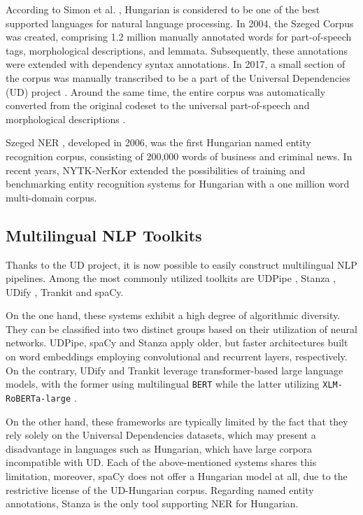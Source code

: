 \documentclass[runningheads,a4paper]{llncs}
\newcommand{\spacy}{spaCy}
\newcommand{\udpipe}{UDPipe}
\newcommand{\stanza}{Stanza}
\newcommand{\trankit}{Trankit}
\newcommand{\udify}{UDify}
\newcommand{\universaldependencies}{Universal Dependencies}
\newcommand{\ud}{UD}
\newcommand{\udhu}{UD-Hungarian}
\newcommand{\szegedcorpus}{Szeged Corpus}
\newcommand{\nerkor}{NYTK-NerKor}
\newcommand{\szegedner}{Szeged NER}
\newcommand{\bert}{\texttt{BERT}}
\newcommand{\xlmroberta}{\texttt{XLM-RoBERTa-large}}
\begin{document}
According to Simon et al. \cite{metanet}, Hungarian is considered to be one of the best supported languages for natural language processing. In 2004, the \szegedcorpus{} \cite{szc} was created, comprising 1.2 million manually annotated words for part-of-speech tags, morphological descriptions, and lemmata. Subsequently, these annotations were extended \cite{szeged-treebank} with dependency syntax annotations. In 2017, a small section of the corpus was manually transcribed to be a part of the \universaldependencies{} (\ud) project \cite{nivre-etal-2020-universal}. Around the same time, the entire corpus was automatically converted from the original codeset to the universal part-of-speech and morphological descriptions \cite{vincze-etal-2017-universal}.

\szegedner{} \cite{szarvas-ner}, developed in 2006, was the first Hungarian named entity recognition corpus, consisting of 200,000 words of business and criminal news. In recent years, \nerkor{} \cite{nerkor} extended the possibilities of training and benchmarking entity recognition systems for Hungarian with a one million word multi-domain corpus.

\subsection{Multilingual NLP Toolkits} \label{sec:background:toolkits}

Thanks to the \ud{} project, it is now possible to easily construct multilingual NLP pipelines. Among the most commonly utilized toolkits are \udpipe{} \cite{udpipe}, \stanza{} \cite{stanza}, \udify{} \cite{udify}, \trankit{} \cite{van2021trankit} and \spacy.

On the one hand, these systems exhibit a high degree of algorithmic diversity. They can be classified into two distinct groups based on their utilization of neural networks. \udpipe, \spacy{} and \stanza{} apply older, but faster architectures built on word embeddings employing convolutional and recurrent layers, respectively. On the contrary, \udify{} and \trankit{} leverage transformer-based large language models, with the former using multilingual \bert{} \cite{devlin2018bert} while the latter utilizing \xlmroberta{} \cite{conneau2019unsupervised}.

On the other hand, these frameworks are typically limited by the fact that they rely solely on the \universaldependencies{} datasets, which may present a disadvantage in languages such as Hungarian, which have large corpora incompatible with \ud. Each of the above-mentioned systems shares this limitation, moreover, \spacy{} does not offer a Hungarian model at all, due to the restrictive license of the \udhu{} corpus. Regarding named entity annotations, \stanza{} is the only tool supporting NER for Hungarian.
\end{document}
